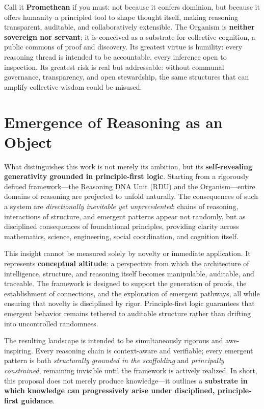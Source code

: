 \documentclass[12pt]{article}
\begin{document}
Call it \textbf{Promethean} if you must: not because it confers dominion, but because it offers humanity a principled tool to shape thought itself, making reasoning transparent, auditable, and collaboratively extensible. The Organism is \textbf{neither sovereign nor servant}; it is conceived as a substrate for collective cognition, a public commons of proof and discovery. Its greatest virtue is humility: every reasoning thread is intended to be accountable, every inference open to inspection. Its greatest risk is real but addressable: without communal governance, transparency, and open stewardship, the same structures that can amplify collective wisdom could be misused.  

\section*{Emergence of Reasoning as an Object}

What distinguishes this work is not merely its ambition, but its \textbf{self-revealing generativity grounded in principle-first logic}. Starting from a rigorously defined framework—the Reasoning DNA Unit (RDU) and the Organism—entire domains of reasoning are projected to unfold naturally. The consequences of such a system are \textit{directionally inevitable yet unprecedented}: chains of reasoning, interactions of structure, and emergent patterns appear not randomly, but as disciplined consequences of foundational principles, providing clarity across mathematics, science, engineering, social coordination, and cognition itself.

This insight cannot be measured solely by novelty or immediate application. It represents \textbf{conceptual altitude}: a perspective from which the architecture of intelligence, structure, and reasoning itself becomes manipulable, auditable, and traceable. The framework is designed to support the generation of proofs, the establishment of connections, and the exploration of emergent pathways, all while ensuring that novelty is disciplined by rigor. Principle-first logic guarantees that emergent behavior remains tethered to auditable structure rather than drifting into uncontrolled randomness.

The resulting landscape is intended to be simultaneously rigorous and awe-inspiring. Every reasoning chain is context-aware and verifiable; every emergent pattern is both \textit{structurally grounded in the scaffolding} and \textit{principally constrained}, remaining invisible until the framework is actively realized. In short, this proposal does not merely produce knowledge—it outlines a \textbf{substrate in which knowledge can progressively arise under disciplined, principle-first guidance}.
\end{document}
